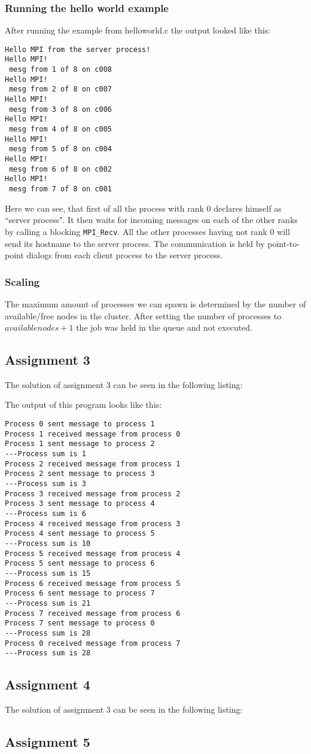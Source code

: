 	\subsubsection*{Running the hello world example}
	After running the example from helloworld.c the output looked like this:
\begin{verbatim}
Hello MPI from the server process!
Hello MPI!
 mesg from 1 of 8 on c008
Hello MPI!
 mesg from 2 of 8 on c007
Hello MPI!
 mesg from 3 of 8 on c006
Hello MPI!
 mesg from 4 of 8 on c005
Hello MPI!
 mesg from 5 of 8 on c004
Hello MPI!
 mesg from 6 of 8 on c002
Hello MPI!
 mesg from 7 of 8 on c001
\end{verbatim}
	Here we can see, that first of all the process with rank 0 declares himself as ``server process". It then waits for incoming messages on each of the other ranks by calling a blocking \texttt{MPI\_Recv}. All the other processes having not rank 0 will send its hostname to the server process. The communication is held by point-to-point dialogs from each client process to the server process.
	\subsubsection*{Scaling} 
	The maximum amount of processes we can spawn is determined by the number of available/free nodes in the cluster. After setting the number of processes to $available nodes + 1$ the job was held in the queue and not executed.


	\subsection{Assignment 3}
		The solution of assignment 3 can be seen in the following listing:

		
		The output of this program looks like this:

\begin{verbatim}	
Process 0 sent message to process 1
Process 1 received message from process 0
Process 1 sent message to process 2
---Process sum is 1
Process 2 received message from process 1
Process 2 sent message to process 3
---Process sum is 3
Process 3 received message from process 2
Process 3 sent message to process 4
---Process sum is 6
Process 4 received message from process 3
Process 4 sent message to process 5
---Process sum is 10
Process 5 received message from process 4
Process 5 sent message to process 6
---Process sum is 15
Process 6 received message from process 5
Process 6 sent message to process 7
---Process sum is 21
Process 7 received message from process 6
Process 7 sent message to process 0
---Process sum is 28
Process 0 received message from process 7
---Process sum is 28
\end{verbatim}

	\subsection{Assignment 4}
		
		The solution of assignment 3 can be seen in the following listing:
		


	\subsection{Assignment 5}

